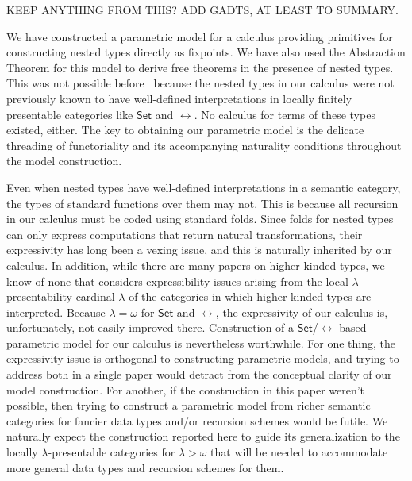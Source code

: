 \documentclass{lmcs}
\theoremstyle{plain}\newtheorem{satz}[thm]{Satz}
\newcommand{\set}{\mathsf{Set}}
\begin{document}
{\color{red} KEEP ANYTHING FROM THIS? ADD GADTS, AT LEAST TO SUMMARY.

We have constructed a parametric model for a calculus
providing primitives for constructing nested types directly as
fixpoints.
We have also used the Abstraction Theorem for this model to derive
free theorems in the presence of nested types. This was not possible
before~\cite{jp19} because the nested types in our calculus were not
previously known to have well-defined interpretations in locally
finitely presentable categories like $\set$ and $\rel$. No calculus
for terms of these types existed, either. The key to obtaining our
parametric model is
the delicate threading of functoriality and its accompanying
naturality conditions throughout the model construction.

Even when nested types have well-defined interpretations in a semantic
category, the types of standard functions over them may not. This is
because all recursion in our calculus must be coded using standard
folds.  Since folds for nested types can only express computations
that return natural transformations, their expressivity has long been
a vexing issue, and this is naturally inherited by our calculus.
In addition, while there are many papers on higher-kinded types, we
know of none that considers expressibility issues arising from the
local $\lambda$-presentability cardinal $\lambda$ of the categories in
which higher-kinded types are interpreted. Because $\lambda = \omega$
for $\set$ and $\rel$, the expressivity of our
calculus is, unfortunately, not easily improved there. Construction of
a $\set$/$\rel$-based parametric model for our calculus is
nevertheless worthwhile.  For one thing, the expressivity issue is
orthogonal to constructing parametric models,
and trying to address both in a single paper would
detract from the conceptual clarity of our model construction.
%
For another, if the construction in this paper
weren't possible, then trying to construct a parametric model from
richer semantic categories for fancier data types and/or recursion
schemes would be futile. We naturally expect the construction reported
here to guide its generalization to the locally $\lambda$-presentable
categories for $\lambda > \omega$ that will be needed to accommodate
more general data types and recursion schemes for them.

}
\end{document}
